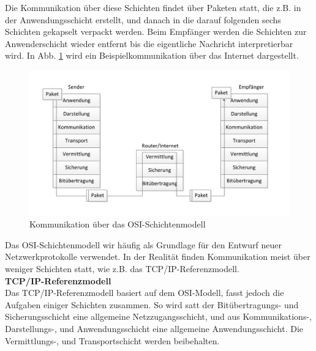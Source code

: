 \noindent Die Kommunikation über diese Schichten findet über Paketen statt, die z.B. in der Anwendungsschicht erstellt, und danach in die darauf folgenden sechs Schichten gekapselt verpackt werden. Beim Empfänger werden die Schichten zur Anwenderschicht wieder entfernt bis die eigentliche Nachricht interpretierbar wird. In Abb. \ref{osi} wird ein Beispielkommunikation über das Internet dargestellt.\\
\begin{figure}[h]
    \centering\includegraphics[scale=0.7]{Bilder/OSI.pdf}
  \caption{Kommunikation über das OSI-Schichtenmodell}
  \label{osi}
\end{figure}

\noindent Das OSI-Schichtenmodell wir häufig als Grundlage für den Entwurf neuer Netzwerkprotokolle verwendet. In der Realität finden Kommunikation meist über weniger Schichten statt, wie z.B. das TCP/IP-Referenzmodell.\\

\noindent\textbf{TCP/IP-Referenzmodell}\\
\noindent Das TCP/IP-Referenzmodell basiert auf dem OSI-Modell, fasst jedoch die Aufgaben einiger Schichten zusammen. So wird satt der Bitübertragungs- und Sicherungsschicht eine allgemeine Netzzugangsschicht, und aus Kommunikations-, Darstellungs-, und Anwendungsschicht eine allgemeine Anwendungsschicht. Die Vermittlungs-, und Transportschicht werden beibehalten. \\
